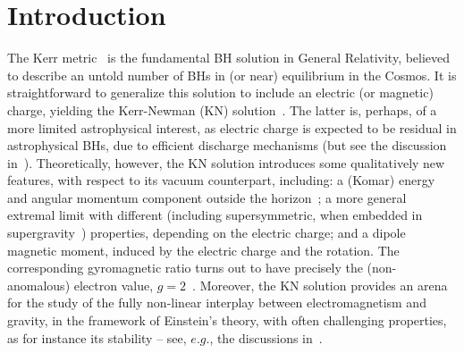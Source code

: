 \section{Introduction}
The Kerr metric~\cite{Kerr:1963ud} is the fundamental BH solution in General Relativity, believed to describe an untold number of BHs in (or near) equilibrium in the Cosmos. It is straightforward to generalize this solution to include an electric (or magnetic) charge, yielding the Kerr-Newman (KN) solution~\cite{Newman:1965my}. The latter is, perhaps, of a more limited astrophysical interest, as electric charge is expected to be residual in astrophysical BHs, due to efficient discharge mechanisms (but see the discussion in~\cite{Cardoso:2016olt}). Theoretically, however, the KN solution introduces some qualitatively new features, with respect to its vacuum counterpart, including: a (Komar) energy and angular momentum component outside the horizon~\cite{Delgado:2016zxv}; a more general extremal limit with different (including supersymmetric, when embedded in supergravity~\cite{Gibbons:1982fy,Tod:1983pm,Herdeiro:2000ap}) properties, depending on the electric charge; and a dipole magnetic moment, induced by the electric charge and the rotation. The corresponding gyromagnetic ratio turns out to have precisely the (non-anomalous) electron value, $g=2$~\cite{Carter:1968rr}. Moreover, the KN solution provides an arena for the study of the fully non-linear interplay between electromagnetism and gravity, in the framework of Einstein's theory, with often challenging properties, as for instance its stability -- see, $e.g.$, the discussions in~\cite{Pani:2013ija,Pani:2013wsa,Zilhao:2014wqa}.

\bigskip

